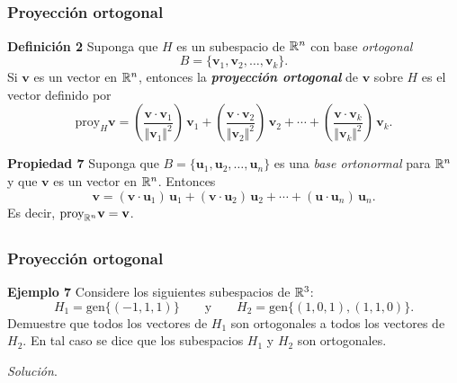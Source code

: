 
\subsection{}

{\nologo
\begin{frame}\frametitle{Proyección ortogonal}

\begin{defi}{\textbf{Definición 2}}
	\justifying
	Suponga que $H$ es un subespacio de $\mathbb{R}^n$ con base \textit{ortogonal} 
	\[
	B = \{ \mathbf{v}_1, \mathbf{v}_2, \hdots, \mathbf{v}_k\}.
	\]
	Si $\mathbf{v}$ es un vector en $\mathbb{R}^n$, entonces la \textbf{\textit{proyección ortogonal}} de $\mathbf{v}$ sobre $H$
	es el vector definido por
	\[
	\text{proy}_H \mathbf{v} = \left( \frac{\mathbf{v}\cdot \mathbf{v}_1}{\Vert \mathbf{v}_1 \Vert^2} \right)\, \mathbf{v}_1 + 
	\left( \frac{\mathbf{v}\cdot \mathbf{v}_2}{\Vert \mathbf{v}_2 \Vert^2} \right)\, \mathbf{v}_2 + \cdots 
	+ \left( \frac{\mathbf{v}\cdot \mathbf{v}_k}{\Vert \mathbf{v}_k \Vert^2} \right)\, \mathbf{v}_k.
	\]
	
	\vspace{-1mm}
\end{defi}	

\begin{prop}{\textbf{Propiedad 7}}
	\justifying
	Suponga que $B = \{ \mathbf{u}_1, \mathbf{u}_2, \hdots, \mathbf{u}_n\}$ es una \textit{base ortonormal} para $\mathbb{R}^n$ y que
	$\mathbf{v}$ es un vector en $\mathbb{R}^n$. Entonces 
	\[
	\mathbf{v} = (\mathbf{v}\cdot \mathbf{u}_1)\, \mathbf{u}_1 + (\mathbf{v}\cdot \mathbf{u}_2)\, \mathbf{u}_2 + \cdots 
	+ (\mathbf{u}\cdot \mathbf{u}_n)\, \mathbf{u}_n.
	\]
	Es decir, $\text{proy}_{\mathbb{R}^n} \mathbf{v} = \mathbf{v}$.
\end{prop}	

\end{frame}
}


\subsection{}

\begin{frame}\frametitle{Proyección ortogonal}
	
	\begin{ej}{\textbf{Ejemplo 7}}\justifying 
		Considere los siguientes subespacios de $\mathbb{R}^3$:
		\[
		H_1 = \text{gen} \{ (-1,1,1)\} \qquad \text{y} \qquad H_2 = \text{gen} \{ (1,0,1),(1,1,0)\}.
		\]
		Demuestre que todos los vectores de $H_1$ son ortogonales a todos los vectores de $H_2$.
		En tal caso se dice que los subespacios $H_1$ y $H_2$ son ortogonales.
	\end{ej}
	\textit{Solución}.	
	
\end{frame}

